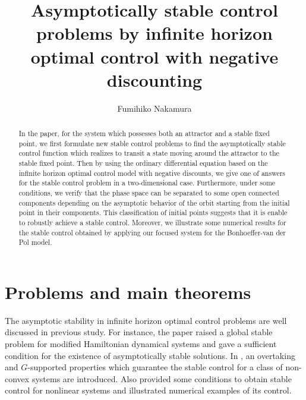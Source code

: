 \documentclass[11pt,reqno]{amsart}
\begin{document}
  \title[Asymptotically stable control problems]{Asymptotically stable control problems by infinite horizon optimal control with negative discounting}
  
  

  \author[F. Nakamura]{Fumihiko Nakamura}
  \address[F. Nakamura]{Kitami Institute of Technology, Kitami, 090-8507, Japan}

    \date{}


  
\begin{abstract}
In the paper, for the system which possesses both an attractor and a stable fixed point, we first formulate new stable control problems to find the asymptotically stable control function which realizes to transit a state moving around the attractor to the stable fixed point. Then by using the ordinary differential equation based on the infinite horizon optimal control model with negative discounts, we give one of answers for the stable control problem in a two-dimensional case. Furthermore, under some conditions, we verify that the phase space can be separated to some open connected components depending on the asymptotic behavior of the orbit starting from the initial point in their components. This classification of initial points suggests that it is enable to robustly achieve a stable control. Moreover, we illustrate some numerical results for the stable control obtained by applying our focused system for the Bonhoeffer-van der Pol model.
\end{abstract}


  \maketitle
  
  
\section{Problems and main theorems}

The asymptotic stability in infinite horizon optimal control problems are well discussed in previous study. For instance, the paper \cite{Brock} raised a global stable problem for modified Hamiltonian dynamical systems and gave a sufficient condition for the existence of asymptotically stable solutions. In \cite{Haurie}, an overtaking and $G$-supported properties which guarantee the stable control for a class of non-convex systems are introduced. Also \cite{Gaitsgory} provided some conditions to obtain stable control for nonlinear systems and illustrated numerical examples of its control.
\end{document}
